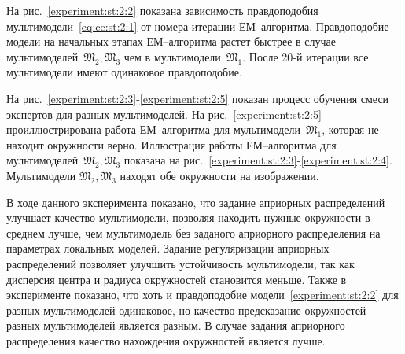 \documentclass[12pt, twoside]{article}
\numberwithin{equation}{section}
\begin{document}
На рис.~\ref{experiment:st:2:2} показана зависимость правдоподобия мультимодели~\eqref{eq:ce:st:2:1} от номера итерации ЕМ--алгоритма. Правдоподобие модели на начальных этапах ЕМ--алгоритма растет быстрее в случае мультимоделей~$\mathfrak{M}_2, \mathfrak{M}_3$ чем в мультимодели~$\mathfrak{M}_1$. После 20-й итерации все мультимодели имеют одинаковое правдоподобие.

На рис.~\ref{experiment:st:2:3}-\ref{experiment:st:2:5} показан процесс обучения смеси экспертов для разных мультимоделей. На рис.~\ref{experiment:st:2:5} проиллюстрирована работа ЕМ--алгоритма для мультимодели~$\mathfrak{M}_1$, которая не находит окружности верно. Иллюстрация работы ЕМ--алгоритма для мультимоделей~$\mathfrak{M}_2, \mathfrak{M}_3$ показана на рис.~\ref{experiment:st:2:3}-\ref{experiment:st:2:4}. Мультимодели $\mathfrak{M}_2, \mathfrak{M}_3$ находят обе окружности на изображении.

В ходе данного эксперимента показано, что задание априорных распределений улучшает качество мультимодели, позволяя находить нужные окружности в среднем лучше, чем мультимодель без заданого априорного распределения на параметрах локальных моделей. Задание регуляризации априорных распределений позволяет улучшить устойчивость мультимодели, так как дисперсия центра и радиуса окружностей становится меньше.
Также в эксперименте показано, что хоть и правдоподобие модели~\eqref{experiment:st:2:2} для разных мультимоделей одинаковое, но качество предсказание окружностей разных мультимоделей является разным. В случае задания априорного распределения качество нахождения окружностей является лучше.
\end{document}
